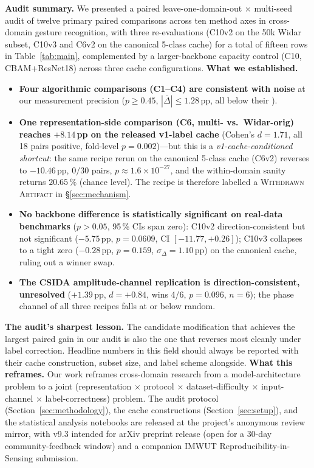 \documentclass[journal,11pt]{IEEEtran}
\newcommand{\CSI}{\text{CSI}}
\newcommand{\MDE}{\text{MDE}}
\newcommand{\Rx}{\text{Rx}}
\begin{document}
%
\noindent\textbf{Audit summary.} We presented a paired leave-one-domain-out $\times$ multi-seed audit of twelve primary paired comparisons across ten method axes in \CSI{} cross-domain gesture recognition, with three re-evaluations (C10v2 on the 50k Widar subset, C10v3 and C6v2 on the canonical 5-class cache) for a total of fifteen rows in Table~\ref{tab:main}, complemented by a larger-backbone capacity control (C10, CBAM+ResNet18) across three cache configurations.
%
\noindent\textbf{What we established.}
\begin{itemize}
    \item \textbf{Four algorithmic comparisons (C1--C4) are consistent with noise} at our measurement precision ($p \geq 0.45$, $|\bar{\Delta}| \leq 1.28$\,pp, all below their \MDE{}).
    \item \textbf{One representation-side comparison (C6, multi-\Rx{} vs.\ Widar-orig) reaches $+8.14$\,pp on the released v1-label cache} (Cohen's $d = 1.71$, all 18 pairs positive, fold-level $p = 0.002$)---but this is a \emph{v1-cache-conditioned shortcut}: the same recipe rerun on the canonical 5-class cache (C6v2) reverses to $-10.46$\,pp, $0/30$ pairs, $p \approx 1.6 \times 10^{-27}$, and the within-domain sanity returns $20.65\,\%$ (chance level). The recipe is therefore labelled a \textsc{Withdrawn Artifact} in \S\ref{sec:mechanism}.
    \item \textbf{No backbone difference is statistically significant on real-data benchmarks} ($p > 0.05$, 95\,\% CIs span zero): C10v2 direction-consistent but not significant ($-5.75$\,pp, $p = 0.0609$, CI $[-11.77, +0.26]$); C10v3 collapses to a tight zero ($-0.28$\,pp, $p = 0.159$, $\sigma_{\Delta} = 1.10$\,pp) on the canonical cache, ruling out a winner swap.
    \item \textbf{The CSIDA amplitude-channel replication is direction-consistent, unresolved} ($+1.39$\,pp, $d = +0.84$, wins 4/6, $p = 0.096$, $n = 6$); the phase channel of all three recipes falls at or below random.
\end{itemize}
%
\noindent\textbf{The audit's sharpest lesson.} The candidate modification that achieves the largest paired gain in our audit is also the one that reverses most cleanly under label correction. Headline numbers in this field should always be reported with their cache construction, subset size, and label scheme alongside.
%
\noindent\textbf{What this reframes.} Our work reframes \CSI{} cross-domain research from a model-architecture problem to a joint (representation $\times$ protocol $\times$ dataset-difficulty $\times$ input-channel $\times$ label-correctness) problem. The audit protocol (Section~\ref{sec:methodology}), the cache constructions (Section~\ref{sec:setup}), and the statistical analysis notebooks are released at the project's anonymous review mirror, with v9.3 intended for arXiv preprint release (open for a 30-day community-feedback window) and a companion IMWUT Reproducibility-in-Sensing submission.
\end{document}
